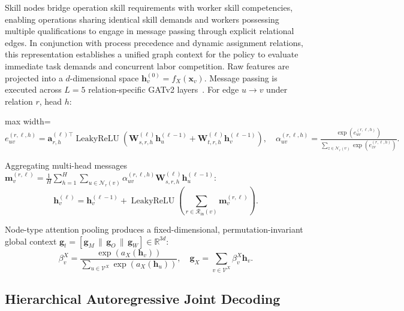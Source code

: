 \documentclass[journal,10pt]{IEEEtran}
\begin{document}
Skill nodes bridge operation skill requirements with worker skill competencies, enabling operations sharing identical skill demands and workers possessing multiple qualifications to engage in message passing through explicit relational edges. In conjunction with process precedence and dynamic assignment relations, this representation establishes a unified graph context for the policy to evaluate immediate task demands and concurrent labor competition. Raw features are projected into a $d$-dimensional space $\mathbf h_v^{(0)}=f_X(\mathbf x_v)$. Message passing is executed across $L=5$ relation-specific GATv2 layers~\cite{brody2022}. For edge $u\rightarrow v$ under relation $r$, head $h$:
\begin{center}
\begin{adjustbox}{max width=\linewidth}
$\displaystyle
e_{uv}^{(r,\ell,h)} = \mathbf a_{r,h}^{(\ell)\top}\operatorname{LeakyReLU}\left(\mathbf W_{s,r,h}^{(\ell)}\mathbf h_u^{(\ell-1)} + \mathbf W_{t,r,h}^{(\ell)}\mathbf h_v^{(\ell-1)}\right), \quad
\alpha_{uv}^{(r,\ell,h)} = \frac{\exp\left(e_{uv}^{(r,\ell,h)}\right)}{\sum_{z\in\mathcal N_r(v)}\exp\left(e_{zv}^{(r,\ell,h)}\right)}.
$
\end{adjustbox}
\end{center}
Aggregating multi-head messages $\mathbf m_v^{(r,\ell)} = \frac{1}{H}\sum_{h=1}^H\sum_{u\in\mathcal N_r(v)}\alpha_{uv}^{(r,\ell,h)}\mathbf W_{s,r,h}^{(\ell)}\mathbf h_u^{(\ell-1)}$:
\begin{equation}
\mathbf h_v^{(\ell)} = \mathbf h_v^{(\ell-1)} + \operatorname{LeakyReLU}\left(\sum_{r\in\mathcal R_{\mathrm{in}}(v)}\mathbf m_v^{(r,\ell)}\right).
\end{equation}

Node-type attention pooling produces a fixed-dimensional, permutation-invariant global context $\mathbf g_t=[\mathbf g_M \,\|\, \mathbf g_O \,\|\, \mathbf g_W]\in\mathbb R^{3d}$:
\begin{equation}
\beta_v^X = \frac{\exp(a_X(\mathbf h_v))}{\sum_{u\in\mathcal V^X}\exp(a_X(\mathbf h_u))}, \quad \mathbf g_X = \sum_{v\in\mathcal V^X}\beta_v^X\mathbf h_v.
\end{equation}

\subsection{Hierarchical Autoregressive Joint Decoding}
\end{document}

